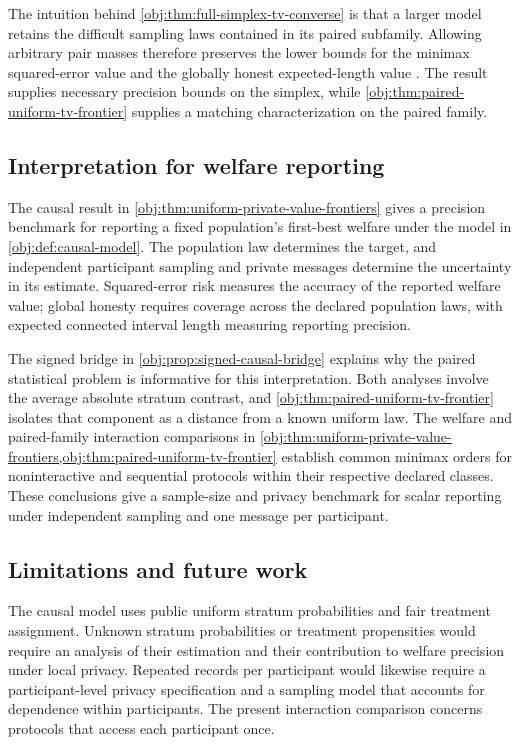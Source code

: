 The intuition behind \cref{obj:thm:full-simplex-tv-converse} is that a larger model retains the difficult sampling laws contained in its paired subfamily. Allowing arbitrary pair masses therefore preserves the lower bounds for the minimax squared-error value  and the globally honest expected-length value . The result supplies necessary precision bounds on the simplex, while \cref{obj:thm:paired-uniform-tv-frontier} supplies a matching characterization on the paired family.

\subsection{Interpretation for welfare reporting}

The causal result in \cref{obj:thm:uniform-private-value-frontiers} gives a precision benchmark for reporting a fixed population's first-best welfare under the model in \cref{obj:def:causal-model}. The population law determines the target, and independent participant sampling and private messages determine the uncertainty in its estimate. Squared-error risk measures the accuracy of the reported welfare value; global honesty requires coverage across the declared population laws, with expected connected interval length measuring reporting precision.

The signed bridge in \cref{obj:prop:signed-causal-bridge} explains why the paired statistical problem is informative for this interpretation. Both analyses involve the average absolute stratum contrast, and \cref{obj:thm:paired-uniform-tv-frontier} isolates that component as a distance from a known uniform law. The welfare and paired-family interaction comparisons in \cref{obj:thm:uniform-private-value-frontiers,obj:thm:paired-uniform-tv-frontier} establish common minimax orders for noninteractive and sequential protocols within their respective declared classes. These conclusions give a sample-size and privacy benchmark for scalar reporting under independent sampling and one message per participant.

\subsection{Limitations and future work}

The causal model uses public uniform stratum probabilities and fair treatment assignment. Unknown stratum probabilities or treatment propensities would require an analysis of their estimation and their contribution to welfare precision under local privacy. Repeated records per participant would likewise require a participant-level privacy specification and a sampling model that accounts for dependence within participants. The present interaction comparison concerns protocols that access each participant once.

